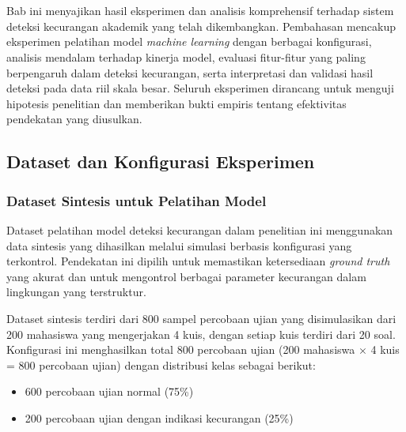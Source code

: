 \chapter{\babEmpat}
\label{bab:4}

Bab ini menyajikan hasil eksperimen dan analisis komprehensif terhadap sistem deteksi kecurangan akademik yang telah dikembangkan. Pembahasan mencakup eksperimen pelatihan model \textit{machine learning} dengan berbagai konfigurasi, analisis mendalam terhadap kinerja model, evaluasi fitur-fitur yang paling berpengaruh dalam deteksi kecurangan, serta interpretasi dan validasi hasil deteksi pada data riil skala besar. Seluruh eksperimen dirancang untuk menguji hipotesis penelitian dan memberikan bukti empiris tentang efektivitas pendekatan yang diusulkan.

\section{Dataset dan Konfigurasi Eksperimen}
\label{sec:datasetKonfigurasi}

\subsection{Dataset Sintesis untuk Pelatihan Model}
\label{subsec:datasetSintesis}

Dataset pelatihan model deteksi kecurangan dalam penelitian ini menggunakan data sintesis yang dihasilkan melalui simulasi berbasis konfigurasi yang terkontrol. Pendekatan ini dipilih untuk memastikan ketersediaan \textit{ground truth} yang akurat dan untuk mengontrol berbagai parameter kecurangan dalam lingkungan yang terstruktur.

Dataset sintesis terdiri dari 800 sampel percobaan ujian yang disimulasikan dari 200 mahasiswa yang mengerjakan 4 kuis, dengan setiap kuis terdiri dari 20 soal. Konfigurasi ini menghasilkan total 800 percobaan ujian (200 mahasiswa $\times$ 4 kuis = 800 percobaan ujian) dengan distribusi kelas sebagai berikut:
\begin{itemize}
    \item 600 percobaan ujian normal (75\%)
    \item 200 percobaan ujian dengan indikasi kecurangan (25\%)
\end{itemize}

